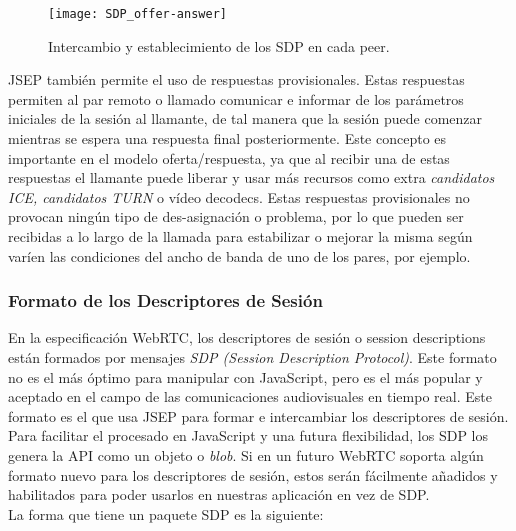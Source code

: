 \begin{figure}[htb]
\centering
\texttt{[image: SDP\_offer-answer]}
\caption{Intercambio y establecimiento de los SDP en cada peer.}
\label{fig:sdp-oferta-respuesta}
\end{figure}

JSEP también permite el uso de respuestas provisionales. Estas respuestas permiten al par remoto o llamado comunicar e informar de los parámetros iniciales de la sesión al llamante, de tal manera que la sesión puede comenzar mientras se espera una respuesta final posteriormente. Este concepto es importante en el modelo oferta/respuesta, ya que al recibir una de estas respuestas el llamante puede liberar y usar más recursos como extra \textit{candidatos ICE, candidatos TURN} o vídeo decodecs. Estas respuestas provisionales no provocan ningún tipo de des-asignación o problema, por lo que pueden ser recibidas a lo largo de la llamada para estabilizar o mejorar la misma según varíen las condiciones del ancho de banda de uno de los pares, por ejemplo.\\


\subsubsection{Formato de los Descriptores de Sesión}

En la especificación WebRTC, los descriptores de sesión o session descriptions están formados por mensajes \textit{SDP (Session Description Protocol)}. Este formato no es el más óptimo para manipular con JavaScript, pero es el más popular y aceptado en el campo de las comunicaciones audiovisuales en tiempo real. Este formato es el que usa JSEP para formar e intercambiar los descriptores de sesión.\\

Para facilitar el procesado en JavaScript y una futura flexibilidad, los SDP los genera la API como un objeto o \textit{blob}. Si en un futuro WebRTC soporta algún formato nuevo para los descriptores de sesión, estos serán fácilmente añadidos y habilitados para poder usarlos en nuestras aplicación en vez de SDP.\\

La forma que tiene un paquete SDP es la siguiente:


